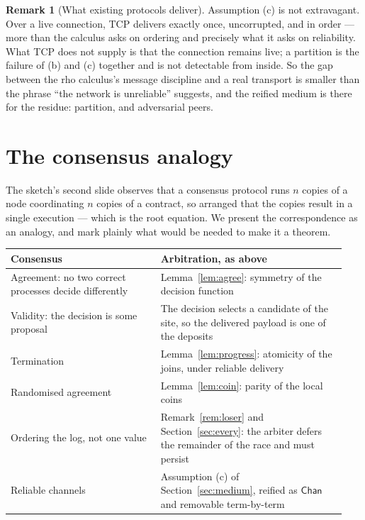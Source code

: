 \documentclass[11pt]{article}
\theoremstyle{definition}
\newtheorem{remark}[theorem]{Remark}
\newcommand{\rhoc}{rho calculus}
\begin{document}
\begin{remark}[What existing protocols deliver]
Assumption (c) is not extravagant. Over a live connection, TCP \cite{RFC793} delivers exactly once, uncorrupted, and in order --- more than the calculus asks on ordering and precisely what it asks on reliability. What TCP does not supply is that the connection remains live; a partition is the failure of (b) and (c) together and is not detectable from inside. So the gap between the \rhoc{}'s message discipline and a real transport is smaller than the phrase ``the network is unreliable'' suggests, and the reified medium is there for the residue: partition, and adversarial peers.
\end{remark}

\section{The consensus analogy}\label{sec:consensus}

The sketch's second slide observes that a consensus protocol runs $n$ copies of a node coordinating $n$ copies of a contract, so arranged that the copies result in a single execution --- which is the root equation. We present the correspondence as an analogy, and mark plainly what would be needed to make it a theorem.

\begin{center}
\begin{tabular}{@{}p{0.42\linewidth}p{0.52\linewidth}@{}}
\hline
\textbf{Consensus} & \textbf{Arbitration, as above} \\
\hline
Agreement: no two correct processes decide differently & Lemma~\ref{lem:agree}: symmetry of the decision function \\
Validity: the decision is some proposal & The decision selects a candidate of the site, so the delivered payload is one of the deposits \\
Termination & Lemma~\ref{lem:progress}: atomicity of the joins, under reliable delivery \\
Randomised agreement & Lemma~\ref{lem:coin}: parity of the local coins \\
Ordering the log, not one value & Remark~\ref{rem:loser} and Section~\ref{sec:every}: the arbiter defers the remainder of the race and must persist \\
Reliable channels & Assumption (c) of Section~\ref{sec:medium}, reified as $\mathsf{Chan}$ and removable term-by-term \\
\hline
\end{tabular}
\end{center}
\end{document}
